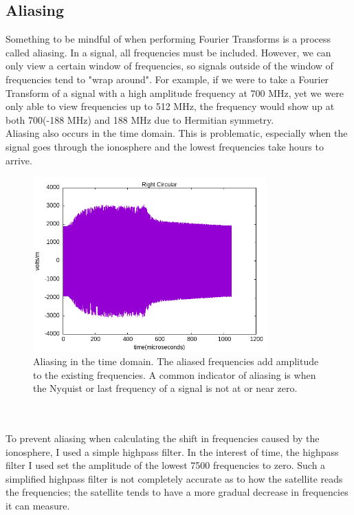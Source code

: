 \documentclass[12pt, reqno]{amsart}
\begin{document}
\subsection{Aliasing}
\noindent Something to be mindful of when performing Fourier Transforms is a process called aliasing. In a signal, all frequencies must be included. However, we can only view a certain window of frequencies, so signals outside of the window of frequencies tend to "wrap around". For example, if we were to take a Fourier Transform of a signal with a high amplitude frequency at 700  MHz, yet we were only able to view frequencies up to 512 MHz, the frequency would show up at both 700(-188 MHz) and 188 MHz due to Hermitian symmetry. 
\\ Aliasing also occurs in the time domain. This is problematic, especially when the signal goes through the ionosphere and the lowest frequencies take hours to arrive.
    \begin{figure}[h]
    \centering
    \includegraphics[width=0.8\textwidth]{time-aliasing.png}
    \caption{Aliasing in the time domain. The aliased frequencies add amplitude to the existing frequencies. A common indicator of aliasing is when the Nyquist or last frequency of a signal is not at or near zero. }
    \label{fig:time-aliasing}
    \end{figure}
\\
\\
\noindent To prevent aliasing when calculating the shift in frequencies caused by the ionosphere, I used a simple highpass filter. In the interest of time, the highpass filter I used set the amplitude of the lowest 7500 frequencies to zero. Such a simplified highpass filter is not completely accurate as to how the satellite reads the frequencies; the satellite tends to have a more gradual decrease in frequencies it can measure.
\end{document}
